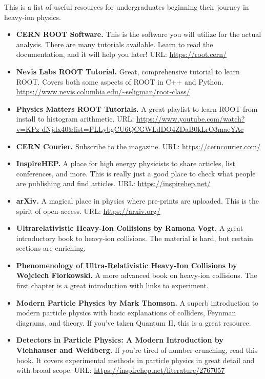 \documentclass[../main.tex]{subfiles}
\begin{document}
This is a list of useful resources for undergraduates beginning their journey in heavy-ion physics. 

\begin{itemize}
    \item \textbf{CERN ROOT Software.} This is the software you will utilize for the actual analysis. There are many tutorials available. Learn to read the documentation, and it will help you later! URL: \url{https://root.cern/}
    \item \textbf{Nevis Labs ROOT Tutorial.} Great, comprehensive tutorial to learn ROOT. Covers both some aspects of ROOT in C++ and Python. \url{https://www.nevis.columbia.edu/~seligman/root-class/}
    \item \textbf{Physics Matters ROOT Tutorials.} A great playlist to learn ROOT from install to histogram arithmetic. URL: \url{https://www.youtube.com/watch?v=KPz-dNjdx40&list=PLLybgCU6QCGWLdDO4ZDaB0kLrO3maeYAe}
    \item \textbf{CERN Courier.} Subscribe to the magazine. URL: \url{https://cerncourier.com/}
    \item \textbf{InspireHEP.} A place for high energy physicists to share articles, list conferences, and more. This is really just a good place to check what people are publishing and find articles. URL: \url{https://inspirehep.net/}
    \item \textbf{arXiv.} A magical place in physics where pre-prints are uploaded. This is the spirit of open-access. URL: \url{https://arxiv.org/} 
    \item \textbf{Ultrarelativistic Heavy-Ion Collisions by Ramona Vogt.} A great introductory book to heavy-ion collisions. The material is hard, but certain sections are enriching. 
    \item \textbf{Phenomenology of Ultra-Relativistic Heavy-Ion Collisions by Wojciech Florkowski.} A more advanced book on heavy-ion collisions. The first chapter is a great introduction with links to experiment. 
    \item \textbf{Modern Particle Physics by Mark Thomson.} A superb introduction to modern particle physics with basic explanations of colliders, Feynman diagrams, and theory. If you've taken Quantum II, this is a great resource. 
    \item \textbf{Detectors in Particle Physics: A Modern Introduction by Viehhauser and Weidberg.} If you're tired of number crunching, read this book. It covers experimental methods in particle physics in great detail and with broad scope. URL: \url{https://inspirehep.net/literature/2767057}

\end{itemize}
\end{document}
